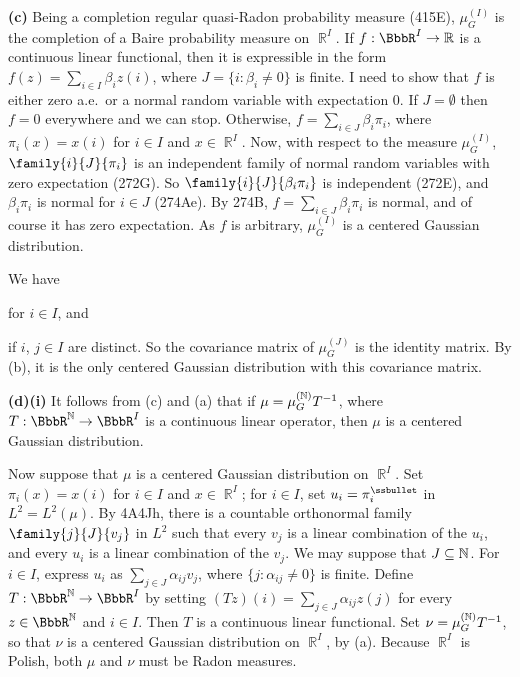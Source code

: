 {\medskip

{\bf (c)} Being a completion regular quasi-Radon probability measure
(415E), $\mu^{(I)}_G$ is the completion of a Baire probability measure
on $\BbbR^I$.   If $f:\BbbR^I\to\Bbb R$ is a continuous linear
functional, then it is expressible in the form
$f(z)=\sum_{i\in I}\beta_iz(i)$, where $J=\{i:\beta_i\ne 0\}$ is finite.
I need to show that $f$ is either zero a.e.\ or a normal random variable
with expectation $0$.   If $J=\emptyset$ then $f=0$ everywhere and we
can stop.
Otherwise, $f=\sum_{i\in J}\beta_i\pi_i$, where $\pi_i(x)=x(i)$ for
$i\in I$ and $x\in\BbbR^I$.   Now, with respect to the measure
$\mu_G^{(I)}$, $\family{i}{J}{\pi_i}$ is an independent family of normal
random variables with zero expectation (272G).   So
$\family{i}{J}{\beta_i\pi_i}$ is independent (272E), and $\beta_i\pi_i$
is normal for $i\in J$ (274Ae).   By 274B,
$f=\sum_{i\in J}\beta_i\pi_i$ is normal, and of course it has zero
expectation.
As $f$ is arbitrary, $\mu_G^{(I)}$ is a centered Gaussian distribution.

We have


\noindent for $i\in I$, and


\noindent if $i$, $j\in I$ are distinct.   So the covariance matrix of
$\mu_G^{(J)}$ is the identity matrix.   By (b), it is the only centered
Gaussian distribution with this covariance matrix.

\medskip

{\bf (d)(i)} It follows from (c) and (a) that if
$\mu=\mu_G^{(\Bbb N)}T^{-1}$, where $T:\BbbR^{\Bbb N}\to\BbbR^I$ is a
continuous linear operator, then $\mu$ is a centered Gaussian
distribution.

\medskip

 Now suppose that $\mu$ is a centered Gaussian
distribution on $\BbbR^I$.   Set $\pi_i(x)=x(i)$ for $i\in I$ and
$x\in\BbbR^I$;  for
$i\in I$, set $u_i=\pi_i^{\ssbullet}$ in $L^2=L^2(\mu)$.   By 4A4Jh,
there is a countable orthonormal family $\family{j}{J}{v_j}$ in $L^2$
such that every $v_j$ is a linear combination of the $u_i$, and every
$u_i$ is a linear combination of the $v_j$.   We may suppose that
$J\subseteq\Bbb N$.   For $i\in I$, express $u_i$ as
$\sum_{j\in J}\alpha_{ij}v_j$, where $\{j:\alpha_{ij}\ne 0\}$ is finite.
Define $T:\BbbR^{\Bbb N}\to\BbbR^I$ by setting
$(Tz)(i)=\sum_{j\in J}\alpha_{ij}z(j)$ for every $z\in\BbbR^{\Bbb N}$ and
$i\in I$.   Then $T$ is a continuous linear functional.   Set
$\nu=\mu_G^{(\Bbb N)}T^{-1}$, so that $\nu$ is a centered Gaussian
distribution on $\BbbR^I$, by (a).   Because $\BbbR^I$ is Polish, both
$\mu$ and $\nu$ must be Radon measures.

}
